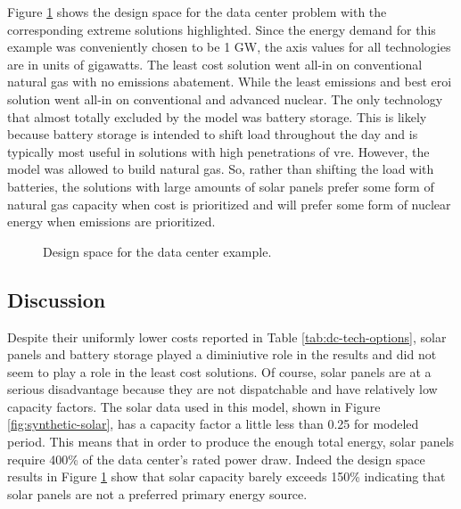Figure \ref{fig:dc_design_space} shows the design space for the data center
problem with the corresponding extreme solutions highlighted. Since the energy
demand for this example was conveniently chosen to be 1 GW, the axis values for
all technologies are in units of gigawatts. The least cost solution went all-in
on conventional natural gas with no emissions abatement. While the least
emissions and best \ac{eroi} solution went all-in on conventional and advanced
nuclear. The only technology that almost totally excluded by the model was
battery storage. This is likely because battery storage is intended to shift
load throughout the day and is typically most useful in solutions with high
penetrations of \ac{vre}. However, the model was allowed to build natural gas.
So, rather than shifting the load with batteries, the solutions with large
amounts of solar panels prefer some form of natural gas capacity when cost is
prioritized and will prefer some form of nuclear energy when emissions are
prioritized.

\begin{figure}[htbp!]
    \centering
    \resizebox{\columnwidth}{!}{}
    \caption{Design space for the data center example.}
    \label{fig:dc_design_space}
\end{figure}




\FloatBarrier
\subsection{Discussion}

Despite their uniformly lower costs reported in Table \ref{tab:dc-tech-options},
solar panels and battery storage played a diminiutive role in the results and
did not seem to play a role in the least cost solutions. Of course, solar panels
are at a serious disadvantage because they are not dispatchable and have
relatively low capacity factors. The solar data used in this model, shown in
Figure \ref{fig:synthetic-solar}, has a capacity factor a little less than 0.25
for modeled period. This means that in order to produce the enough total energy,
solar panels require 400\% of the data center's rated power draw. Indeed the
design space results in Figure \ref{fig:dc_design_space} show that solar
capacity barely exceeds 150\% indicating that solar panels are not a preferred
primary energy source.


